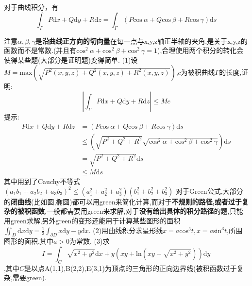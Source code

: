 \documentclass{ctexart}
\begin{document}
\section{}
对于曲线积分，有$$\int_{\Gamma}P\mathrm{d}x+Q\mathrm{d}y+R\mathrm{d}z=\int_{\Gamma}(P\mathrm{cos}\ \alpha+Q\mathrm{cos}\ \beta+R\mathrm{cos}\ \gamma)\mathrm{d}s$$

注意$\alpha,\beta,\gamma$是\textbf{沿曲线正方向的切向量}在每一点与x,y,z轴正半轴的夹角,是关于x,y,z的函数而不是常数.(并且有$\mathrm{cos}^{2}\ \alpha+\mathrm{cos}^{2}\ \beta+\mathrm{cos}^{2}\ \gamma=1$),合理使用两个积分的转化会使得某些题(大部分是证明题)变得简单.
\newline
\newline
\newline
(1)设$M=\mathrm{max}(\sqrt{P^{2}(x,y,z)+Q^{2}(x,y,z)+R^{2}(x,y,z)})$,$c$为被积曲线$\Gamma$的长度,证明:$$\left|\int_{\Gamma}P\mathrm{d}x+Q\mathrm{d}y+R\mathrm{d}z\right|\leq Mc$$
\newline
提示:
\begin{align}
P\mathrm{d}x+Q\mathrm{d}y+R\mathrm{d}z&=(P\mathrm{cos}\ \alpha+Q\mathrm{cos}\ \beta+R\mathrm{cos}\ \gamma)\mathrm{d}s\nonumber\\
&\leq (\sqrt{P^{2}+Q^{2}+R^{2}}\sqrt{\mathrm{cos}^{2}\ \alpha+\mathrm{cos}^{2}\ \beta+\mathrm{cos}^{2}\ \gamma})\mathrm{d}s\nonumber\\
&=\sqrt{P^{2}+Q^{2}+R^{2}}\mathrm{d}s\nonumber\\
&\leq M\mathrm{d}s\nonumber
\end{align}
其中用到了Cauchy不等式$(a_{1}b_{1}+a_{2}b_{2}+a_{3}b_{3})^{2}\leq (a_{1}^{2}+a_{2}^{2}+a^{2}_{3})(b_{1}^{2}+b_{2}^{2}+b^{2}_{3})$
\newline
\newline
对于Green公式,大部分的\textbf{闭曲线}(比如圆,椭圆)都可以用green来简化计算,而对于\textbf{不规则的路径,或者过于复杂的被积函数},一般都需要用green来求解,对于\textbf{没有给出具体的积分路径}的题,只能用green求解,另外green的变形还能用于计算某些图形的面积$\iint_{D}\mathrm{d}x\mathrm{d}y=\frac{1}{2}\int_{\partial D}x\mathrm{d}y-y\mathrm{d}x$.
\newline
\newline
(2)用曲线积分求星形线$x=a\mathrm{cos}^{3}t,x=a\mathrm{sin}^{3}t$,所围图形的面积,其中$a>0$为常数.
\newline
\newline
(3)求$$I=\int_{C}\sqrt{x^{2}+y^{2}}\mathrm{d}x+y(xy+\mathrm{ln}(xy+\sqrt{x^{2}+y^{2}}))\mathrm{d}y$$,其中$C$是以点A(1,1),B(2,2),E(3,1)为顶点的三角形的正向边界线(被积函数过于复杂,需要green).
\end{document}
